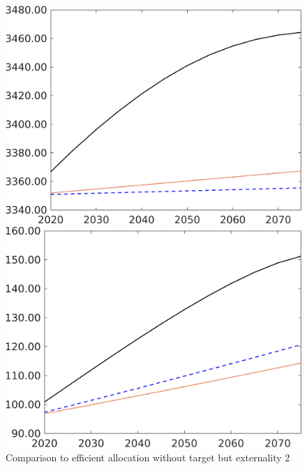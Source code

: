 \begin{figure}[h!!]
	\centering
	\caption{Comparison to efficient allocation without target but externality 2}\label{fig:Compno_eff_extern2}
	\begin{minipage}[]{0.32\textwidth}
	\includegraphics[width=1\textwidth]{../../codding_model/own_basedOnFried/optimalPol_elastS_DisuSci/figures/all_1705/Extern_CompEff_Af_spillover0_noskill0_sep1_BN0_ineq0_red0_etaa0.79_lgd0.png}
\end{minipage}
\begin{minipage}[]{0.32\textwidth}
	\includegraphics[width=1\textwidth]{../../codding_model/own_basedOnFried/optimalPol_elastS_DisuSci/figures/all_1705/Extern_CompEff_Ag_spillover0_noskill0_sep1_BN0_ineq0_red0_etaa0.79_lgd0.png}

\end{minipage}
\end{figure}
